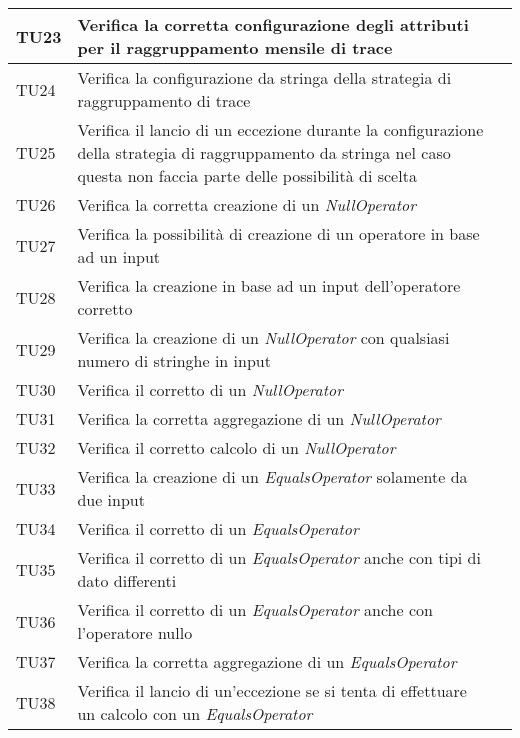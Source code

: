 \begin{longtable}{  | >{\centering\arraybackslash}m{2.5cm} 
						| >{\raggedright\arraybackslash}m{9cm} 
						| >{\centering\arraybackslash}m{3.5cm} | }
				TU23 & Verifica la corretta configurazione degli attributi per il raggruppamento mensile di trace
						& \donetext{} \\ \hline
				TU24 & Verifica la configurazione da stringa della strategia di raggruppamento di trace 
						& \donetext{} \\ \hline
				TU25 & Verifica il lancio di un eccezione durante la configurazione della strategia di raggruppamento da stringa
						nel caso questa non faccia parte delle possibilità di scelta
						& \donetext{} \\ \hline
						
				TU26 & Verifica la corretta creazione di un \textit{NullOperator}
						& \donetext{} \\ \hline
				TU27 & Verifica la possibilità di creazione di un operatore in base ad un input
						& \donetext{} \\ \hline
				TU28 & Verifica la creazione in base ad un input dell'operatore corretto 
						& \donetext{} \\ \hline
				TU29 & Verifica la creazione di un \textit{NullOperator} con qualsiasi numero di stringhe in input
						& \donetext{} \\ \hline
				TU30 & Verifica il corretto \eng{matching} di un \textit{NullOperator}
						& \donetext{} \\ \hline
				TU31 & Verifica la corretta aggregazione di un \textit{NullOperator}
						& \donetext{} \\ \hline
				TU32 & Verifica il corretto calcolo di un \textit{NullOperator}
						& \donetext{} \\ \hline
						
				TU33 & Verifica la creazione di un \textit{EqualsOperator} solamente da due input
						& \donetext{} \\ \hline
				TU34 & Verifica il corretto \eng{matching} di un \textit{EqualsOperator}
						& \donetext{} \\ \hline
				TU35 & Verifica il corretto \eng{match} di un \textit{EqualsOperator} anche con tipi di dato differenti
						& \donetext{} \\ \hline
				TU36 & Verifica il corretto \eng{match} di un \textit{EqualsOperator} anche con l'operatore nullo
						& \donetext{} \\ \hline
				TU37 & Verifica la corretta aggregazione di un \textit{EqualsOperator}
						& \donetext{} \\ \hline
				TU38 & Verifica il lancio di un'eccezione se si tenta di effettuare un calcolo con un \textit{EqualsOperator}
						& \donetext{} \\ \hline
									

\end{longtable}
